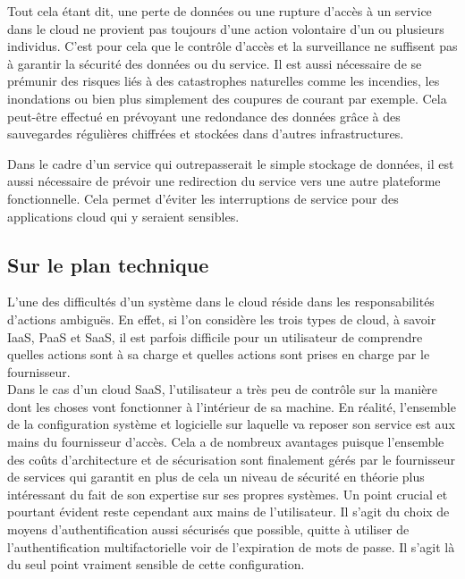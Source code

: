 \documentclass[a4paper, 12pt]{article}
\begin{document}
\begin{spacing}{1.1}
      Tout cela étant dit, une perte de données ou une rupture d'accès à un
      service dans le cloud ne provient pas toujours d'une action volontaire
      d'un ou plusieurs individus. C'est pour cela que le contrôle d'accès et la
      surveillance ne suffisent pas à garantir la sécurité des données ou
      du service. Il est aussi nécessaire de se prémunir des risques liés à des
      catastrophes naturelles comme les incendies, les inondations ou bien plus
      simplement des coupures de courant par exemple. Cela peut-être
      effectué en prévoyant une redondance des données grâce à des sauvegardes
      régulières chiffrées et stockées dans d'autres infrastructures.

      Dans le cadre d'un service qui outrepasserait le simple stockage de
      données, il est aussi nécessaire de prévoir une redirection du service
      vers une autre plateforme fonctionnelle. Cela permet d'éviter les
      interruptions de service pour des applications cloud qui y seraient
      sensibles.

    \subsection{Sur le plan technique}
      L'une des difficultés d'un système dans le cloud réside dans les
      responsabilités d'actions ambiguës. En effet, si l'on considère les
      trois types de cloud, à savoir IaaS, PaaS et SaaS, il est parfois
      difficile pour un utilisateur de comprendre quelles actions sont à
      sa charge et quelles actions sont prises en charge par le fournisseur. \\

      Dans le cas d'un cloud SaaS, l'utilisateur a très peu de contrôle sur
      la manière dont les choses vont fonctionner à l'intérieur de sa machine.
      En réalité, l'ensemble de la configuration système et logicielle sur
      laquelle va reposer son service est aux mains du fournisseur d'accès.
      Cela a de nombreux avantages puisque l'ensemble des coûts d'architecture
      et de sécurisation sont finalement gérés par le fournisseur de services
      qui garantit en plus de cela un niveau de sécurité en théorie plus
      intéressant du fait de son expertise sur ses propres systèmes. Un point
      crucial et pourtant évident reste cependant aux mains de l'utilisateur.
      Il s'agit du choix de moyens d'authentification aussi sécurisés que
      possible, quitte à utiliser de l'authentification multifactorielle voir
      de l'expiration de mots de passe. Il s'agit là du seul point vraiment
      sensible de cette configuration. \\


\end{spacing}
\end{document}
